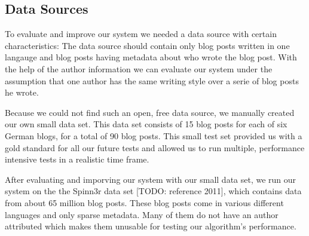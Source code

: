 
\subsection{Data Sources}
\label{sec:data_sources}


To evaluate and improve our system we needed a data source with certain characteristics:
The data source should contain only blog posts written in one langauge and blog posts having metadata about who wrote the blog post.
With the help of the author information we can evaluate our system under the assumption that one author has the same writing style over a serie of blog posts he wrote.

Because we could not find such an open, free data source, we manually created our own small data set.
This data set consists of 15 blog posts for each of six German blogs, for a total of 90 blog posts.
This small test set provided us with a gold standard for all our future tests and allowed us to run multiple, performance intensive tests in a realistic time frame.

After evaluating and imporving our system with our small data set, we run our system on the the Spinn3r data set [TODO: reference 2011], which contains data from about 65 million blog posts.
These blog posts come in various different languages and only sparse metadata.
Many of them do not have an author attributed which makes them unusable for testing our algorithm's performance.


